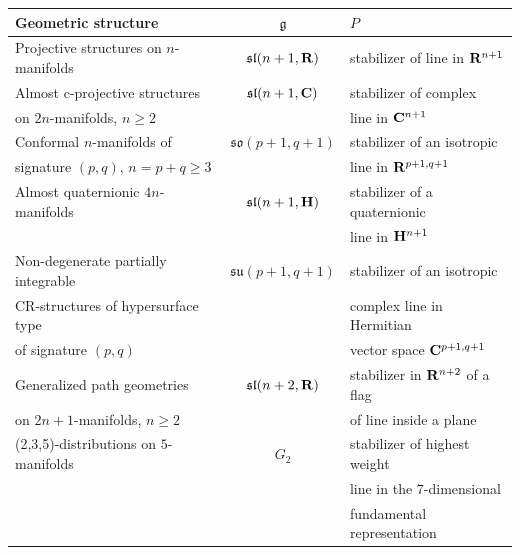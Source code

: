 \documentclass[pdftex]{sigma}
\numberwithin{equation}{section}
\theoremstyle{definition}
\def\C{{\bf C}}
\def\R{{\bf R}}
\newcommand{\BR}{{\bf R}}
\def\g{{\mathfrak g}}
\begin{document}
\begin{table}[h]\centering
\small\renewcommand{\arraystretch}{1.15}
\begin{tabular}{ |l|c|l| }
\hline
 Geometric structure & $\g$ & $P$ \\
\hline\hline
Projective structures on $n$-manifolds & $\mathfrak{sl}(n+1,\BR)$& stabilizer of line in $\BR^{n+1}$\\
\hline
Almost c-projective structures &$\mathfrak{sl}(n+1,\C)$ &stabilizer of complex \\
on $2n$-manifolds, $n\geq 2$ &&line in $\C^{n+1}$\\
\hline
Conformal $n$-manifolds of &$\mathfrak{so}(p+1,q+1)$ & stabilizer of an isotropic \\
signature $(p,q)$, $n=p+q\geq 3$ & &line in $\BR^{p+1,q+1}$ \\
 \hline
 Almost quaternionic $4n$-manifolds& $\mathfrak{sl}(n+1,{\bf H})$ & stabilizer of a quaternionic \\
 &&line in ${\bf H}^{n+1}$ \\
 \hline
 Non-degenerate partially integrable &$\mathfrak{su}(p+1,q+1)$& stabilizer of an isotropic \\
 CR-structures of hypersurface type & &complex line in Hermitian \\
 of signature $(p,q)$ &&vector space $\C^{p+1,q+1}$\\
 \hline
 Generalized path geometries&$\mathfrak{sl}(n+2,\R)$& stabilizer in $\BR^{n+2}$ of a flag \\
 on $2n+1$-manifolds, $n\geq 2$ && of line inside a plane\\
 \hline
 (2,3,5)-distributions on $5$-manifolds &$G_2$&stabilizer of highest weight\\
 && line in the $7$-dimensional \\
 &&fundamental representation\\
 \hline
\end{tabular}
\end{table}
\end{document}
